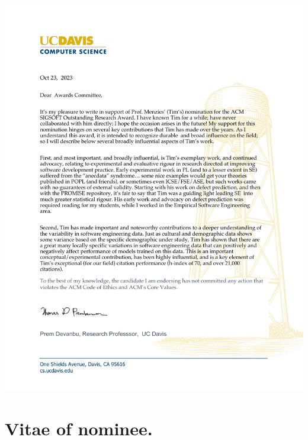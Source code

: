 \documentclass[10pt]{article}
\begin{document}
\hspace{-1cm}\includegraphics[width=8in]{menzies-sigsoft.pdf}

\newpage
\section{Vitae of nominee.}
\end{document}
